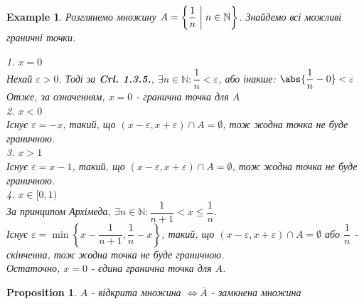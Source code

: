 \documentclass[a4paper, 14pt]{article}
\theoremstyle{theoremdd}
\theoremstyle{theoremdd}
\theoremstyle{theoremdd}
\theoremstyle{theoremdd}
\newtheorem{example}[theorem]{Example}
\theoremstyle{theoremdd}
\newtheorem{proposition}[theorem]{Proposition}
\theoremstyle{theoremdd}
\theoremstyle{theoremdd}
\theoremstyle{theoremdd}
\begin{document}
\begin{example}
Розглянемо множину $A = \left\{ \dfrac{1}{n} \biggm| n \in \mathbb{N} \right\}$. Знайдемо всі можливі граничні точки.
\begin{figure}[H]
\centering
{}
\end{figure}
1. $x = 0$\\
Нехай $\varepsilon > 0$. Тоді за \textbf{Crl. 1.3.5.}, $\exists n \in \mathbb{N}: \dfrac{1}{n} < \varepsilon$, або інакше: $\abs{\dfrac{1}{n}-0} < \varepsilon$\\
Отже, за означенням, $x = 0$ - гранична точка для $A$
\bigskip \\
2. $x < 0$\\
Існує $\varepsilon = -x$, такий, що $(x-\varepsilon,x+\varepsilon) \cap A = \emptyset$, тож жодна точка не буде граничною.
\bigskip \\
3. $x > 1$\\
Існує $\varepsilon = x-1$, такий, що $(x-\varepsilon,x+\varepsilon) \cap A = \emptyset$, тож жодна точка не буде граничною.
\bigskip \\
4. $x \in [0,1)$\\
За принципом Архімеда, $\exists n \in \mathbb{N}: \dfrac{1}{n+1} < x \leq \dfrac{1}{n}$.\\
Існує $\varepsilon = \min \left\{ x - \dfrac{1}{n+1}, \dfrac{1}{n} - x \right\}$, такий, що $(x-\varepsilon, x+\varepsilon) \cap A = \emptyset$ або $\dfrac{1}{n}$ - скінченна, тож жодна точка не буде граничною.
\bigskip \\
Остаточно, $x = 0$ - єдина гранична точка для $A$.

\end{example}

\begin{proposition}
$A$ - відкрита множина $\iff \overline{A}$ - замкнена множина
\end{proposition}
\end{document}
